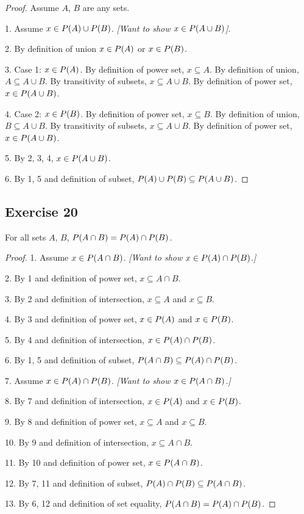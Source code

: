 \documentclass[14pt]{extarticle}
\let\mathscr\relax
\newcommand{\ps}{\mathscr{P}}
\begin{document}
\begin{proof}
  Assume $A$, $B$ are any sets.

  1. Assume \(x \in \ps(A) \cup \ps(B)\). {\it [Want to show \(x \in \ps(A \cup B)\)]}.

  2. By definition of union \(x \in \ps(A)\) or \(x \in \ps(B)\).

  3. Case 1: \(x \in \ps(A)\). By definition of power set, \(x \subseteq A\). By definition of union, \(A \subseteq A
  \cup B\). By transitivity of subsets, \(x \subseteq A \cup B\). By definition of power set, \(x \in \ps(A \cup B)\).

  4. Case 2: \(x \in \ps(B)\). By definition of power set, \(x \subseteq B\). By definition of union, \(B \subseteq A
  \cup B\). By transitivity of subsets, \(x \subseteq A \cup B\). By definition of power set, \(x \in \ps(A \cup B)\).

  5. By 2, 3, 4, \(x \in \ps(A \cup B)\).

  6. By 1, 5 and definition of subset, \(\ps(A) \cup \ps(B) \subseteq \ps(A \cup B)\).
\end{proof}

\subsection{Exercise 20}
For all sets $A$, $B$, \(\ps(A \cap B) = \ps(A) \cap \ps(B)\).

\begin{proof}
  1. Assume \(x \in \ps(A \cap B)\). {\it [Want to show \(x \in \ps(A) \cap \ps(B)\).]}

  2. By 1 and definition of power set, \(x \subseteq A \cap B\).

  3. By 2 and definition of intersection, \(x \subseteq A\) and \(x \subseteq B\).

  4. By 3 and definition of power set, \(x \in \ps(A)\) and \(x \in \ps(B)\).

  5. By 4 and definition of intersection, \(x \in \ps(A) \cap \ps(B)\).

  6. By 1, 5 and definition of subset, \(\ps(A \cap B) \subseteq \ps(A) \cap \ps(B)\).

  7. Assume \(x \in \ps(A) \cap \ps(B)\). {\it [Want to show \(x \in \ps(A \cap B)\).]}

  8. By 7 and definition of intersection, \(x \in \ps(A)\) and \(x \in \ps(B)\).

  9. By 8 and definition of power set, \(x \subseteq A\) and \(x \subseteq B\).

  10. By 9 and definition of intersection, \(x \subseteq A \cap B\).

  11. By 10 and definition of power set, \(x \in \ps(A \cap B)\).

  12. By 7, 11 and definition of subset, \(\ps(A) \cap \ps(B) \subseteq \ps(A \cap B)\).

  13. By 6, 12 and definition of set equality, \(\ps(A \cap B) = \ps(A) \cap \ps(B)\).
\end{proof}
\end{document}
